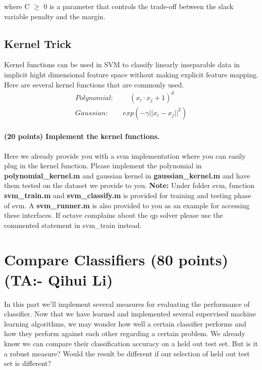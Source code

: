 \documentclass[11pt]{article}
\newcommand{\myfirstta}{Qihui Li}
\begin{document}
where C $\geq$ 0 is a parameter that controls the trade-off between the slack variable
penalty and the margin.

\subsection{Kernel Trick}
Kernel functions can be used in SVM to classify linearly inseparable data in implicit hight dimensional feature space without making explicit feature mapping. Here are several kernel functions that are commonly used.
\begin{align}
Polynomial:~~~~~~~~~~ (x_i \cdot x_j + 1)^d~~~~~~~\\
Gaussian:~~~~~~~~~exp(-\gamma||x_i - x_j||^2)
\end{align}


\paragraph{(20 points) Implement the kernel functions.} Here we already provide you with a svm implementation where you can easily plug in the kernel function. Please implement the polynomial in \textbf{polynomial\_kernel.m} and gaussian kernel in \textbf{gaussian\_kernel.m }and have them tested on the dataset we provide to you. \textbf{Note:} Under folder svm, function \textbf{svm\_train.m} and \textbf{svm\_classify.m} is provided for training and testing phase of svm. A \textbf{svm\_runner.m} is also provided to you as an example for accessing these interfaces. If octave complains about the qp solver please use the commented statement in svm\_train instead. 

\section{Compare Classifiers (80 points)(TA:- \myfirstta)}

 In this part we'll implement several measures for evaluating the performance of classifier. Now that we have learned and implemented several supervised machine learning algorithms, we may wonder how well a certain classifier performs and how they perform against each other regarding a certain problem. We already know we can compare their classification accuracy on a held out test set. But is it a robust measure? Would the result be different if our selection of held out test set is different? 
\end{document}
